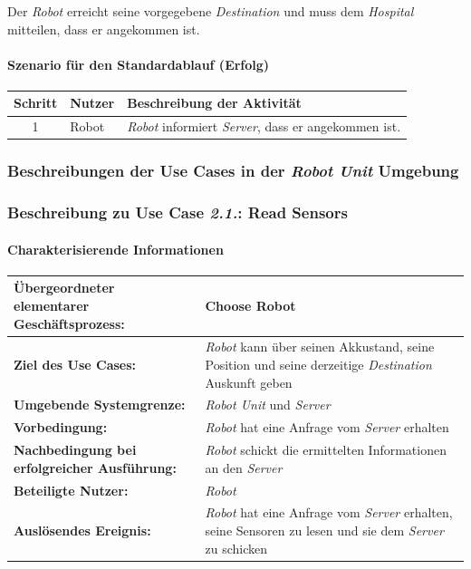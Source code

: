			Der \emph{Robot} erreicht seine vorgegebene \emph{Destination} und muss dem \emph{Hospital} mitteilen, dass er angekommen ist. 

			\paragraph*{Szenario für den Standardablauf (Erfolg)}

			\begin{table}[H]
				\centering
				\begin{tabularx}{\textwidth}{|c|p{2cm}|X|}
				\hline
				Schritt & Nutzer & Beschreibung der Aktivität \\ \hline
				1 & Robot & \emph{Robot} informiert \emph{Server}, dass er angekommen ist. \\
				\hline
				\end{tabularx}
			\end{table}
				
				\pagebreak
		\subsubsection{Beschreibungen der Use Cases in der \emph{Robot Unit} Umgebung}
			\subsubsection{Beschreibung zu Use Case \emph{2.1.}: Read Sensors}
				
				\paragraph*{Charakterisierende Informationen}
				
				\begin{table}[H]
					\centering
					\begin{tabularx}{\textwidth}{|p{5cm}|X|}
						\hline
						\textbf{Übergeordneter elementarer Geschäftsprozess:} & Choose Robot\\ \hline
						\textbf{Ziel des Use Cases:} & \emph{Robot} kann über seinen Akkustand, seine Position und seine derzeitige \emph{Destination} Auskunft geben\\ \hline
						\textbf{Umgebende Systemgrenze:} & \emph{Robot Unit} und \emph{Server} \\ \hline
						\textbf{Vorbedingung:} & \emph{Robot} hat eine Anfrage vom \emph{Server} erhalten \\ \hline
						\textbf{Nachbedingung bei erfolgreicher Ausführung:} & \emph{Robot} schickt die ermittelten Informationen an den \emph{Server} \\ \hline
						\textbf{Beteiligte Nutzer:} & \emph{Robot} \\ \hline
						\textbf{Auslösendes Ereignis:} & \emph{Robot} hat eine Anfrage vom \emph{Server} erhalten, seine Sensoren zu lesen und sie dem \emph{Server} zu schicken \\
						\hline
					\end{tabularx}
				\end{table}
				
